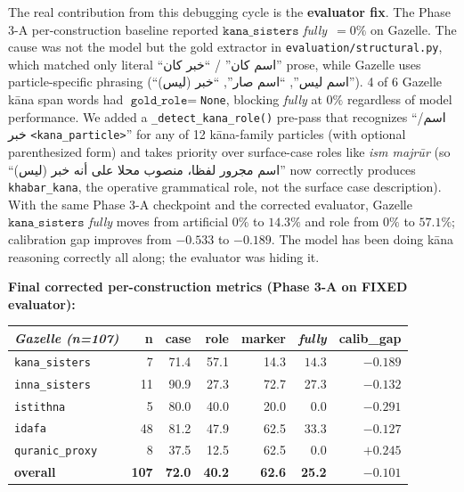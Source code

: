 \documentclass[10pt,a4paper,twocolumn]{article}
\providecommand{\textarabic}[1]{{\arabicfont #1}}
\begin{document}
The real contribution from this debugging cycle is the \textbf{evaluator fix}. The Phase 3-A per-construction baseline reported $\texttt{kana\_sisters}$ \emph{fully}~$=0\%$ on Gazelle. The cause was not the model but the gold extractor in \texttt{evaluation/structural.py}, which matched only literal ``\textarabic{اسم كان}'' / ``\textarabic{خبر كان}'' prose, while Gazelle uses particle-specific phrasing (``\textarabic{اسم ليس}'', ``\textarabic{اسم صار}'', ``\textarabic{خبر (ليس)}''). 4 of 6 Gazelle kāna span words had $\texttt{gold\_role}=$\texttt{None}, blocking \emph{fully} at $0\%$ regardless of model performance. We added a \texttt{\_detect\_kana\_role()} pre-pass that recognizes ``\textarabic{اسم/خبر} \texttt{<kana\_particle>}'' for any of 12 kāna-family particles (with optional parenthesized form) and takes priority over surface-case roles like \emph{ism majrūr} (so ``\textarabic{اسم مجرور لفظا، منصوب محلا على أنه خبر (ليس)}'' now correctly produces \texttt{khabar\_kana}, the operative grammatical role, not the surface case description). With the same Phase 3-A checkpoint and the corrected evaluator, Gazelle $\texttt{kana\_sisters}$ \emph{fully} moves from artificial $0\%$ to $\mathbf{14.3\%}$ and role from $0\%$ to $\mathbf{57.1\%}$; calibration gap improves from $-0.533$ to $-0.189$. The model has been doing kāna reasoning correctly all along; the evaluator was hiding it.

\medskip\noindent\textbf{Final corrected per-construction metrics (Phase 3-A on FIXED evaluator):}

\begin{tabular}{l r r r r r r}
\toprule
\textit{Gazelle (n=107)} & n & case & role & marker & \emph{fully} & calib\_gap \\
\midrule
\texttt{kana\_sisters} & 7 & 71.4 & 57.1 & 14.3 & $\mathbf{14.3}$ & $-0.189$ \\
\texttt{inna\_sisters} & 11 & 90.9 & 27.3 & 72.7 & 27.3 & $-0.132$ \\
\texttt{istithna} & 5 & 80.0 & 40.0 & 20.0 & 0.0 & $-0.291$ \\
\texttt{idafa} & 48 & 81.2 & 47.9 & 62.5 & 33.3 & $-0.127$ \\
\texttt{quranic\_proxy} & 8 & 37.5 & 12.5 & 62.5 & 0.0 & $+0.245$ \\
\textbf{overall} & \textbf{107} & \textbf{72.0} & \textbf{40.2} & \textbf{62.6} & \textbf{25.2} & $-0.101$ \\
\bottomrule
\end{tabular}
\end{document}
